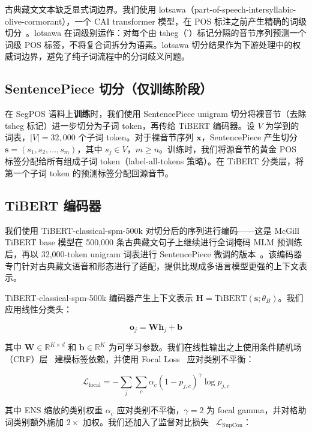 \documentclass[11pt,a4paper]{article}
\DeclareRobustCommand\tib[1]{{\tibetan #1}}
\begin{document}
古典藏文文本缺乏显式词边界。我们使用 lotsawa（part-of-speech-intersyllabic-olive-cormorant），一个 CAI transformer 模型，在 POS 标注之前产生精确的词级切分~\cite{lotsawa}。lotsawa 在词级别运作：对每个由 tsheg（\tib{་}）标记分隔的音节序列预测一个词级 POS 标签，不将复合词拆分为语素。lotsawa 切分结果作为下游处理中的权威词边界，避免了纯子词流程中的分词歧义问题。

\subsection{SentencePiece 切分（仅训练阶段）}

在 SegPOS 语料上\textbf{训练}时，我们使用 SentencePiece unigram 切分将裸音节（去除 tsheg 标记）进一步切分为子词 token，再传给 TiBERT 编码器。设 $V$ 为学到的词表，$|V| = 32{,}000$ 个子词 token。对于裸音节序列 $\mathbf{x}$，SentencePiece 产生切分 $\mathbf{s} = (s_1, s_2, \ldots, s_m)$，其中 $s_j \in V$，$m \geq n$。训练时，我们将源音节的黄金 POS 标签分配给所有组成子词 token（label-all-tokens 策略）。在 TiBERT 分类层，将第一个子词 token 的预测标签分配回源音节。

\subsection{TiBERT 编码器}

我们使用 TiBERT-classical-spm-500k 对切分后的序列进行编码——这是 McGill TiBERT base 模型在 500,000 条古典藏文句子上继续进行全词掩码 MLM 预训练后，再以 32,000-token unigram 词表进行 SentencePiece 微调的版本~\cite{tibert}。该编码器专门针对古典藏文语音和形态进行了适配，提供比现成多语言模型更强的上下文表示。

TiBERT-classical-spm-500k 编码器产生上下文表示 $\mathbf{H} = \text{TiBERT}(\mathbf{s}; \theta_B)$。我们应用线性分类头：

\begin{equation}
\mathbf{o}_j = \mathbf{W} \mathbf{h}_j + \mathbf{b}
\end{equation}

其中 $\mathbf{W} \in \mathbb{R}^{K \times d}$ 和 $\mathbf{b} \in \mathbb{R}^K$ 为可学习参数。我们在线性输出之上使用条件随机场（CRF）层~\cite{lafferty2001} 建模标签依赖，并使用 Focal Loss~\cite{lin2017} 应对类别不平衡：

\begin{equation}
\mathcal{L}_{\text{focal}} = -\sum_j \sum_c \alpha_c (1 - p_{j,c})^{\gamma} \log p_{j,c}
\end{equation}

其中 ENS 缩放的类别权重 $\alpha_c$ 应对类别不平衡，$\gamma=2$ 为 focal gamma，并对格助词类别额外施加 $2\times$ 加权。我们还加入了监督对比损失~\cite{khosla2020} $\mathcal{L}_{\text{SupCon}}$：
\end{document}

